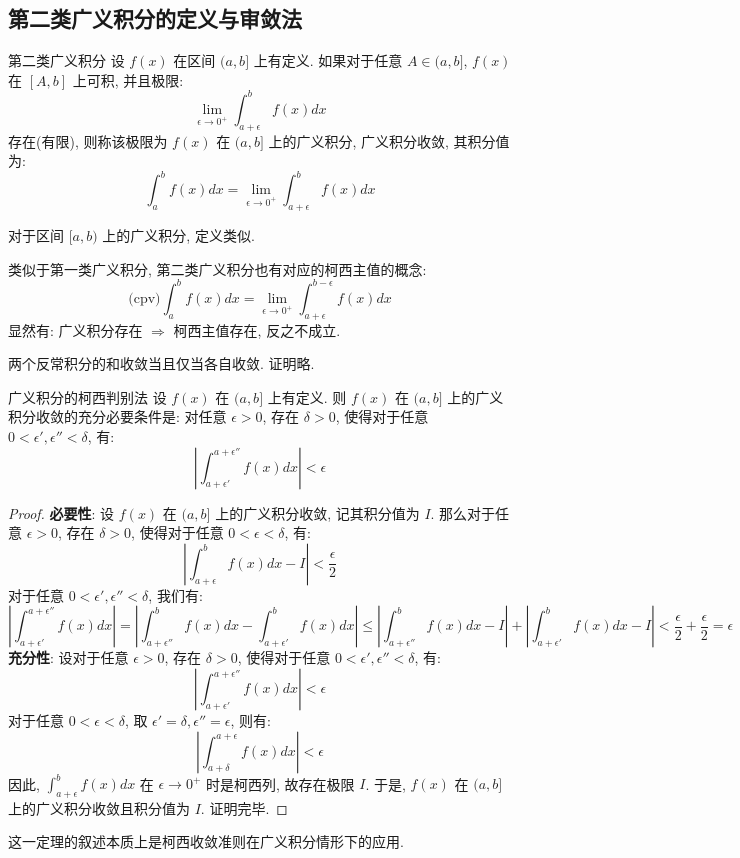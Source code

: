\documentclass[a4paper,12pt]{ctexart}
\begin{document}
\subsection{第二类广义积分的定义与审敛法}

\begin{mydef}{第二类广义积分}{}
设 $f(x)$ 在区间 $(a, b]$ 上有定义. 如果对于任意 $A \in (a, b]$, $f(x)$ 在 $[A, b]$ 上可积, 并且极限:
$$
\lim_{\epsilon \to 0^+} \int_{a+\epsilon}^b f(x) dx
$$
存在(有限), 则称该极限为 $f(x)$ 在 $(a, b]$ 上的广义积分, 广义积分收敛, 其积分值为:
$$
\int_a^b f(x) dx = \lim_{\epsilon \to 0^+} \int_{a+\epsilon}^b f(x) dx
$$
\end{mydef}

对于区间 $[a, b)$ 上的广义积分, 定义类似.

类似于第一类广义积分, 第二类广义积分也有对应的柯西主值的概念:
$$
\text{(cpv)} \int_a^b f(x) dx = \lim_{\epsilon \to 0^+} \int_{a+\epsilon}^{b-\epsilon} f(x) dx
$$
显然有: 广义积分存在 $\Rightarrow$ 柯西主值存在, 反之不成立.

\begin{mythm}{}{}
两个反常积分的和收敛当且仅当各自收敛. 证明略.
\end{mythm}

\begin{mythm}{广义积分的柯西判别法}{}
设 $f(x)$ 在 $(a, b]$ 上有定义. 则 $f(x)$ 在 $(a, b]$ 上的广义积分收敛的充分必要条件是: 对任意 $\epsilon > 0$, 存在 $\delta > 0$, 使得对于任意 $0 < \epsilon', \epsilon'' < \delta$, 有:
$$
\left| \int_{a+\epsilon'}^{a+\epsilon''} f(x) dx \right| < \epsilon
$$
\end{mythm}

\begin{proof}
\textbf{必要性}: 设 $f(x)$ 在 $(a, b]$ 上的广义积分收敛, 记其积分值为 $I$. 那么对于任意 $\epsilon > 0$, 存在 $\delta > 0$, 使得对于任意 $0 < \epsilon < \delta$, 有:
$$
\left| \int_{a+\epsilon}^b f(x) dx - I \right| < \frac{\epsilon}{2}
$$
对于任意 $0 < \epsilon', \epsilon'' < \delta$, 我们有:
$$
\left| \int_{a+\epsilon'}^{a+\epsilon''} f(x) dx \right| = \left| \int_{a+\epsilon''}^b f(x) dx - \int_{a+\epsilon'}^b f(x) dx \right| \leq \left| \int_{a+\epsilon''}^b f(x) dx - I \right| + \left| \int_{a+\epsilon'}^b f(x) dx - I \right| < \frac{\epsilon}{2} + \frac{\epsilon}{2} = \epsilon
$$
\textbf{充分性}: 设对于任意 $\epsilon > 0$, 存在 $\delta > 0$, 使得对于任意 $0 < \epsilon', \epsilon'' < \delta$, 有:
$$
\left| \int_{a+\epsilon'}^{a+\epsilon''} f(x) dx \right| < \epsilon
$$
对于任意 $0 < \epsilon < \delta$, 取 $\epsilon' = \delta, \epsilon'' = \epsilon$, 则有:
$$
\left| \int_{a+\delta}^{a+\epsilon} f(x) dx \right| < \epsilon
$$
因此, $\int_{a+\epsilon}^b f(x) dx$ 在 $\epsilon \to 0^+$ 时是柯西列, 故存在极限 $I$. 于是, $f(x)$ 在 $(a, b]$ 上的广义积分收敛且积分值为 $I$. 证明完毕.
\end{proof}
这一定理的叙述本质上是柯西收敛准则在广义积分情形下的应用.
\end{document}
